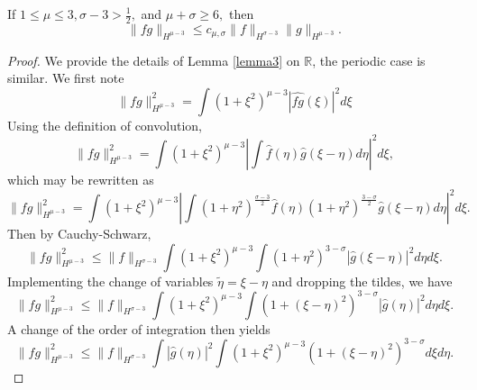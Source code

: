 \documentclass[10pt,a4paper]{amsart}
\begin{document}
\begin{lemma}\label{lemma3}
If $1 \leq \mu \leq 3, \sigma - 3 > \frac12,$ and $\mu + \sigma \geq 6,$ then 
    \[\|fg\|_{H^{\mu-3}} \leq c_{\mu,\sigma} \|f\|_{H^{\sigma-3}} \|g\|_{H^{\mu-3}}.\]
\end{lemma}

\begin{proof}
    We provide the details of Lemma \ref{lemma3} on $\mathbb{R}$, the periodic case is similar. 
We first note 
\begin{equation}
    \| fg \|_{H^{\mu - 3}}^2 = \int(1 + \xi^2)^{\mu-3} \left|\widehat{fg}(\xi)\right|^2 d\xi 
\end{equation}
Using the definition of convolution,
\begin{equation*}
    \| fg \|_{H^{\mu - 3}}^2 = \int(1 + \xi^2)^{\mu-3} \left|\int \hat{f}(\eta) \hat{g}(\xi - \eta)d\eta\right|^2 d\xi, 
\end{equation*}
which may be rewritten as 
\begin{equation}
    \| fg \|_{H^{\mu - 3}}^2 = 
        \int(1 + \xi^2)^{\mu-3} \left|\int (1+\eta^2)^{\frac{\sigma-3}{2}}\hat{f}(\eta)(1+\eta^2)^{\frac{3-\sigma}{2}}\hat{g}(\xi - \eta)d\eta\right|^2 d\xi. 
\end{equation}
Then by Cauchy-Schwarz, 
\begin{equation}
    \| fg \|_{H^{\mu - 3}}^2 \leq 
        \|f\|_{H^{\sigma - 3}} \int(1 + \xi^2)^{\mu-3}\int(1+\eta^2)^{3-\sigma}\left| \hat{g}(\xi - \eta)\right|^2 d\eta d\xi. 
\end{equation}
Implementing the change of variables $\tilde{\eta} = \xi - \eta$ and dropping the tildes, we have 
\begin{equation}
    \| fg \|_{H^{\mu - 3}}^2 \leq 
        \|f\|_{H^{\sigma - 3}} \int(1 + \xi^2)^{\mu-3}\int(1+(\xi - \eta)^2)^{3-\sigma}\left| \hat{g}(\eta)\right|^2 d\eta d\xi. 
\end{equation}
A change of the order of integration then yields
\begin{equation}\label{above}
    \| fg \|_{H^{\mu - 3}}^2 \leq 
        \|f\|_{H^{\sigma - 3}} \int \left| \hat{g}(\eta)\right|^2 \int(1 + \xi^2)^{\mu-3}(1+(\xi - \eta)^2)^{3-\sigma} d\xi d\eta. 

\end{equation}
\end{proof}
\end{document}
